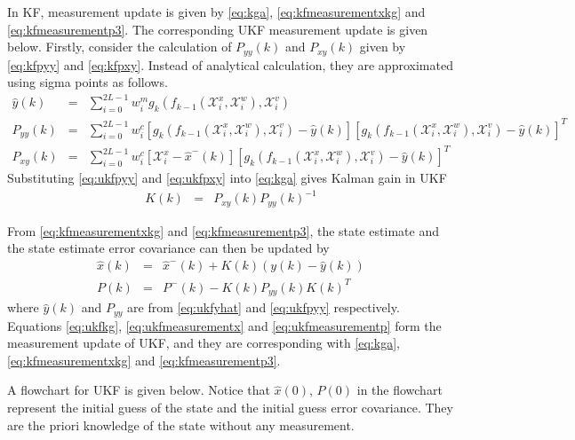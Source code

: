 In KF, measurement update is given by \eqref{eq:kga}, \eqref{eq:kfmeasurementxkg} and \eqref{eq:kfmeasurementp3}. The corresponding UKF measurement update is given below. Firstly, consider the calculation of $P_{yy}(k)$ and $P_{xy}(k)$ given by \eqref{eq:kfpyy} and \eqref{eq:kfpxy}. Instead of analytical calculation, they are approximated using sigma points as follows.
\begin{eqnarray}
	\hat{y}(k) &=& \sum_{i=0}^{2L-1} w_i^m g_k\left(f_{k-1}\left(\mathcal{X}_i^x, \mathcal{X}_i^w\right), \mathcal{X}_i^v\right) \label{eq:ukfyhat} \\
	P_{yy}(k) &=& \sum_{i=0}^{2L-1} w_i^c \left[g_k\left(f_{k-1}\left(\mathcal{X}_i^x, \mathcal{X}_i^w\right), \mathcal{X}_i^v\right) - \hat{y}(k)\right]\left[g_k\left(f_{k-1}\left(\mathcal{X}_i^x, \mathcal{X}_i^w\right), \mathcal{X}_i^v\right) - \hat{y}(k)\right]^T \label{eq:ukfpyy} \\
	P_{xy}(k) &=& \sum_{i=0}^{2L-1} w_i^c \left[\mathcal{X}_i^x -\hat{x}^-(k)\right]\left[g_k\left(f_{k-1}\left(\mathcal{X}_i^x, \mathcal{X}_i^w\right), \mathcal{X}_i^v\right) - \hat{y}(k)\right]^T \label{eq:ukfpxy}
\end{eqnarray}
Substituting \eqref{eq:ukfpyy} and \eqref{eq:ukfpxy} into \eqref{eq:kga} gives Kalman gain in UKF
\begin{eqnarray}
	K(k) &=& P_{xy}(k)P_{yy}(k)^{-1} \label{eq:ukfkg}
\end{eqnarray}

From \eqref{eq:kfmeasurementxkg} and \eqref{eq:kfmeasurementp3}, the state estimate and the state estimate error covariance can then be updated by
\begin{eqnarray}
	\hat{x}(k) &=& \hat{x}^-(k) + K(k)\left(y(k) - \hat{y}(k)\right) \label{eq:ukfmeasurementx} \\
	P(k) &=& P^-(k) - K(k)P_{yy}(k)K(k)^T \label{eq:ukfmeasurementp}
\end{eqnarray}
where $\hat{y}(k)$ and $P_{yy}$ are from \eqref{eq:ukfyhat} and \eqref{eq:ukfpyy} respectively. Equations \eqref{eq:ukfkg}, \eqref{eq:ukfmeasurementx} and \eqref{eq:ukfmeasurementp} form the measurement update of UKF, and they are corresponding with \eqref{eq:kga}, \eqref{eq:kfmeasurementxkg} and \eqref{eq:kfmeasurementp3}.

A flowchart for UKF is given below. Notice that $\hat{x}(0)$, $P(0)$ in the flowchart represent the initial guess of the state and the initial guess error covariance. They are the priori knowledge of the state without any measurement.

